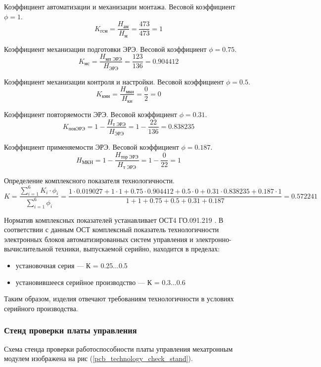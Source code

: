 Коэффициент автоматизации и механизации монтажа.
Весовой коэффициент $\phi = 1$.
$$
K_{\text{гсм}}
    = \frac{H_\text{ам}}
           {H_\text{м}}
    = \frac{473}{473}
    = 1
$$

Коэффициент механизации подготовки ЭРЭ.
Весовой коэффициент $\phi = 0.75$.
$$
K_{\text{мс}}
    = \frac{H_\text{мп ЭРЭ}}
           {H_\text{ЭРЭ}}
    = \frac{123}{136}
    = 0.904412
$$

Коэффициент механизации контроля и настройки.
Весовой коэффициент $\phi = 0.5$.
$$
K_\text{кмн}
    = \frac{H_\text{мкн}}
           {H_\text{кн}}
    = \frac{0}{2}
    = 0
$$

Коэффициент повторяемости ЭРЭ.
Весовой коэффициент $\phi = 0.31$.
$$
K_\text{повЭРЭ}
    = 1 - \frac{H_\text{т ЭРЭ}}
               {H_\text{ЭРЭ}}
    = 1 - \frac{22}{136}
    = 0.838235
$$

Коэффициент применяемости ЭРЭ.
Весовой коэффициент $\phi = 0.187$.
$$
H_{\text{МКН}}
    = 1 - \frac{H_\text{тор ЭРЭ}}
               {H_\text{т ЭРЭ}}
    = 1 - \frac{0}{22}
    = 1
$$

Определение комплексного показателя технологичности.
$$
K   = \frac{\sum_{i=1}^6 K_i \cdot \phi_i }
         {\sum_{i=1}^6 \phi_i }
    = \frac{ 1 \cdot 0.019027
             + 1 \cdot 1
             + 0.75 \cdot 0.904412
             + 0.5 \cdot 0
             + 0.31 \cdot 0.838235
             + 0.187 \cdot 1 }
           { 1
             + 1
             + 0.75
             + 0.5
             + 0.31
             + 0.187 }
    = 0.572241
$$

Норматив комплексных показателей устанавливает
ОСТ4 ГО.091.219 \cite{OST4_GO_010_011}.
В соответствии с данным ОСТ комплексный показатель технологичности электронных
блоков автоматизированных систем управления и электронно-вычислительной техники,
выпускаемой серийно, находится в пределах:

\begin{itemize}
    \item установочная серия --- К = 0.25...0.5
    \item установившееся серийное производство --- К = 0.3...0.6
\end{itemize}

Таким образом, изделия отвечают требованиям технологичности в условиях
серийного производства.

\subsubsection{Стенд проверки платы управления}
Схема стенда проверки работоспособности платы управления мехатронным модулем
изображена на рис (\ref{pcb_technology_check_stand}).

